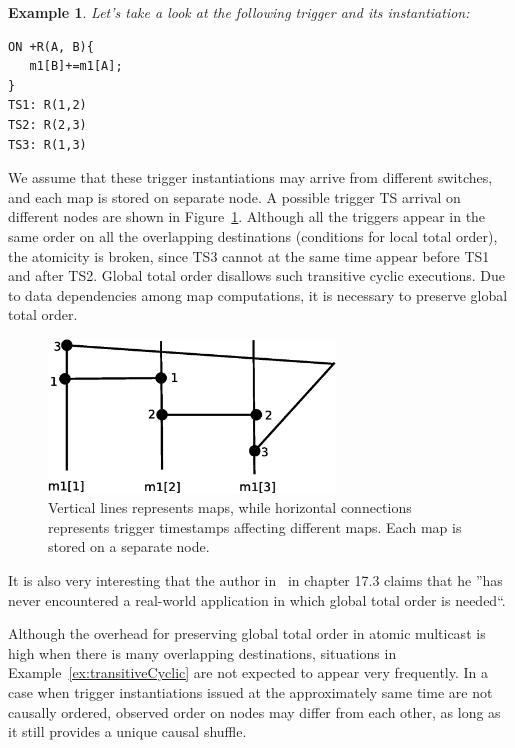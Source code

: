 \documentclass{sig-semester}
\newtheorem{example}[theorem]{Example}
\begin{document}
\begin{example} \em
\label{ex:transitiveCyclic}
Let's take a look at the following trigger and its instantiation:
\begin{verbatim}
ON +R(A, B){
   m1[B]+=m1[A];
}
TS1: R(1,2)
TS2: R(2,3)
TS3: R(1,3)
\end{verbatim}
\end{example}
We assume that these trigger instantiations may arrive from different switches, and each map is stored on separate node. A possible trigger TS arrival on different nodes are shown in Figure~\ref{fig:transitiveCyclic}. Although all the triggers appear in the same order on all the overlapping destinations (conditions for local total order), the atomicity is broken, since TS3 cannot at the same time appear before TS1 and after TS2. Global total order disallows such transitive cyclic executions. Due to data dependencies among map computations, it is necessary to preserve global total order.
\begin{figure}[!t]
\centering
\includegraphics[width=3in]{transitiveCyclic.eps}
\vspace{-3mm}
\caption{Vertical lines represents maps, while horizontal connections represents trigger timestamps affecting different maps. Each map is stored on a separate node.}
\label{fig:transitiveCyclic}
\vspace{-2mm}
\end{figure}

It is also very interesting that the author in~\cite{Birman06} in chapter 17.3 claims that he ''has never encountered a real-world application in which global total order is needed``.

Although the overhead for preserving global total order in atomic multicast is high when there is many overlapping destinations, situations in Example~\ref{ex:transitiveCyclic} are not expected to appear very frequently. In a case when trigger instantiations issued at the approximately same time are not causally ordered, observed order on nodes may differ from each other, as long as it still provides a unique causal shuffle.
\end{document}
